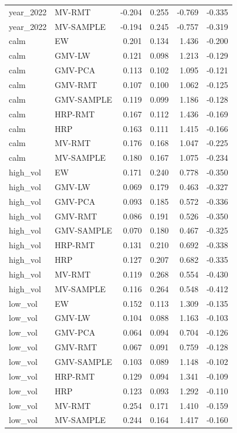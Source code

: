 \begin{table}[t]
{\begin{tabular}{llrrrr}
year\_2022 & MV-RMT & -0.204 & 0.255 & -0.769 & -0.335 \\
year\_2022 & MV-SAMPLE & -0.194 & 0.245 & -0.757 & -0.319 \\
calm & EW & 0.201 & 0.134 & 1.436 & -0.200 \\
calm & GMV-LW & 0.121 & 0.098 & 1.213 & -0.129 \\
calm & GMV-PCA & 0.113 & 0.102 & 1.095 & -0.121 \\
calm & GMV-RMT & 0.107 & 0.100 & 1.062 & -0.125 \\
calm & GMV-SAMPLE & 0.119 & 0.099 & 1.186 & -0.128 \\
calm & HRP-RMT & 0.167 & 0.112 & 1.436 & -0.169 \\
calm & HRP & 0.163 & 0.111 & 1.415 & -0.166 \\
calm & MV-RMT & 0.176 & 0.168 & 1.047 & -0.225 \\
calm & MV-SAMPLE & 0.180 & 0.167 & 1.075 & -0.234 \\
high\_vol & EW & 0.171 & 0.240 & 0.778 & -0.350 \\
high\_vol & GMV-LW & 0.069 & 0.179 & 0.463 & -0.327 \\
high\_vol & GMV-PCA & 0.093 & 0.185 & 0.572 & -0.336 \\
high\_vol & GMV-RMT & 0.086 & 0.191 & 0.526 & -0.350 \\
high\_vol & GMV-SAMPLE & 0.070 & 0.180 & 0.467 & -0.325 \\
high\_vol & HRP-RMT & 0.131 & 0.210 & 0.692 & -0.338 \\
high\_vol & HRP & 0.127 & 0.207 & 0.682 & -0.335 \\
high\_vol & MV-RMT & 0.119 & 0.268 & 0.554 & -0.430 \\
high\_vol & MV-SAMPLE & 0.116 & 0.264 & 0.548 & -0.412 \\
low\_vol & EW & 0.152 & 0.113 & 1.309 & -0.135 \\
low\_vol & GMV-LW & 0.104 & 0.088 & 1.163 & -0.103 \\
low\_vol & GMV-PCA & 0.064 & 0.094 & 0.704 & -0.126 \\
low\_vol & GMV-RMT & 0.067 & 0.091 & 0.759 & -0.128 \\
low\_vol & GMV-SAMPLE & 0.103 & 0.089 & 1.148 & -0.102 \\
low\_vol & HRP-RMT & 0.129 & 0.094 & 1.341 & -0.109 \\
low\_vol & HRP & 0.123 & 0.093 & 1.292 & -0.110 \\
low\_vol & MV-RMT & 0.254 & 0.171 & 1.410 & -0.159 \\
low\_vol & MV-SAMPLE & 0.244 & 0.164 & 1.417 & -0.160 \\
\bottomrule
\end{tabular}}
\end{table}
